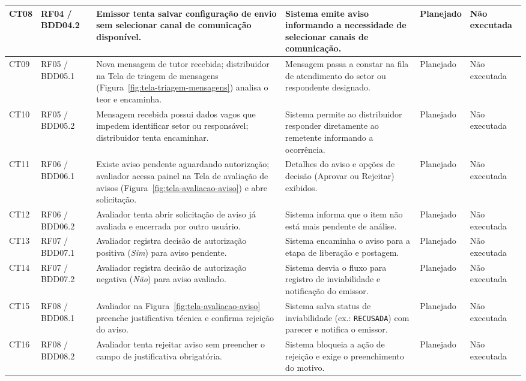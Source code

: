 \documentclass[a4paper,12pt]{report}
\begin{document}
\begin{longtable}{|p{1.2cm}|p{2.0cm}|p{3.8cm}|p{4.0cm}|p{1.6cm}|p{2.0cm}|}
\hline
CT08 & RF04 / BDD04.2 & Emissor tenta salvar configuração de envio sem selecionar canal de comunicação disponível. & Sistema emite aviso informando a necessidade de selecionar canais de comunicação. & Planejado & Não executada \\
\hline
CT09 & RF05 / BDD05.1 & Nova mensagem de tutor recebida; distribuidor na Tela de triagem de mensagens (Figura~\ref{fig:tela-triagem-mensagens}) analisa o teor e encaminha. & Mensagem passa a constar na fila de atendimento do setor ou respondente designado. & Planejado & Não executada \\
\hline
CT10 & RF05 / BDD05.2 & Mensagem recebida possui dados vagos que impedem identificar setor ou responsável; distribuidor tenta encaminhar. & Sistema permite ao distribuidor responder diretamente ao remetente informando a ocorrência. & Planejado & Não executada \\
\hline
CT11 & RF06 / BDD06.1 & Existe aviso pendente aguardando autorização; avaliador acessa painel na Tela de avaliação de avisos (Figura~\ref{fig:tela-avaliacao-aviso}) e abre solicitação. & Detalhes do aviso e opções de decisão (Aprovar ou Rejeitar) exibidos. & Planejado & Não executada \\
\hline
CT12 & RF06 / BDD06.2 & Avaliador tenta abrir solicitação de aviso já avaliada e encerrada por outro usuário. & Sistema informa que o item não está mais pendente de análise. & Planejado & Não executada \\
\hline
CT13 & RF07 / BDD07.1 & Avaliador registra decisão de autorização positiva (\textit{Sim}) para aviso pendente. & Sistema encaminha o aviso para a etapa de liberação e postagem. & Planejado & Não executada \\
\hline
CT14 & RF07 / BDD07.2 & Avaliador registra decisão de autorização negativa (\textit{Não}) para aviso avaliado. & Sistema desvia o fluxo para registro de inviabilidade e notificação do emissor. & Planejado & Não executada \\
\hline
CT15 & RF08 / BDD08.1 & Avaliador na Figura~\ref{fig:tela-avaliacao-aviso} preenche justificativa técnica e confirma rejeição do aviso. & Sistema salva status de inviabilidade (ex.: \texttt{RECUSADA}) com parecer e notifica o emissor. & Planejado & Não executada \\
\hline
CT16 & RF08 / BDD08.2 & Avaliador tenta rejeitar aviso sem preencher o campo de justificativa obrigatória. & Sistema bloqueia a ação de rejeição e exige o preenchimento do motivo. & Planejado & Não executada \\

\end{longtable}
\end{document}
